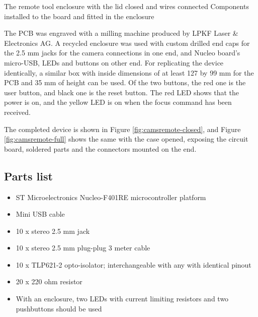 {The remote tool enclosure with the lid closed and wires connected}
{Components installed to the board and fitted in the enclosure}

The PCB was engraved with a milling machine produced by LPKF Laser \& Electronics AG.
A recycled enclosure was used with custom drilled end caps for the 2.5 mm jacks for the camera connections in one end, and Nucleo board's micro-USB, LEDs and buttons on other end.
For replicating the device identically, a similar box with inside dimensions of at least 127 by 99 mm for the PCB and 35 mm of height can be used.
Of the two buttons, the red one is the user button, and black one is the reset button.
The red LED shows that the power is on, and the yellow LED is on when the focus command has been received.

The completed device is shown in Figure \ref{fig:camsremote-closed}, and Figure \ref{fig:camsremote-full} shows the same with the case opened, exposing the circuit board, soldered parts and the connectors mounted on the end.


\subsection{Parts list}

\begin{itemize}
	\item ST Microelectronics Nucleo-F401RE microcontroller platform
	\item Mini USB cable
	\item 10 x stereo 2.5 mm jack
	\item 10 x stereo 2.5 mm plug-plug 3 meter cable
	\item 10 x TLP621-2 opto-isolator; interchangeable with any with identical pinout
	\item 20 x 220 ohm resistor
	\item With an enclosure, two LEDs with current limiting resistors and two pushbuttons should be used
\end{itemize}
